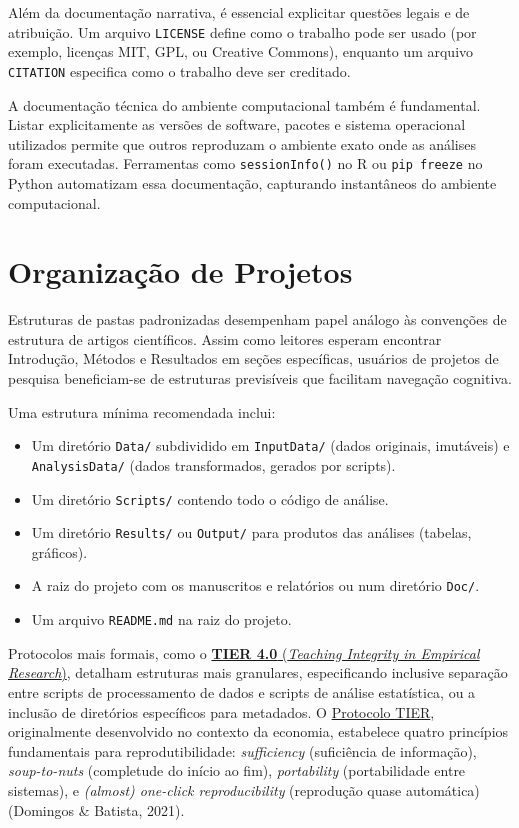 \documentclass[
  a4paper,
]{book}
\providecommand{\tightlist}{%
  \setlength{\itemsep}{0pt}\setlength{\parskip}{0pt}}\usepackage{longtable,booktabs,array}
\begin{document}
Além da documentação narrativa, é essencial explicitar questões legais e
de atribuição. Um arquivo \texttt{LICENSE} define como o trabalho pode
ser usado (por exemplo, licenças MIT, GPL, ou Creative Commons),
enquanto um arquivo \texttt{CITATION} especifica como o trabalho deve
ser creditado.

A documentação técnica do ambiente computacional também é fundamental.
Listar explicitamente as versões de software, pacotes e sistema
operacional utilizados permite que outros reproduzam o ambiente exato
onde as análises foram executadas. Ferramentas como
\texttt{sessionInfo()} no R ou \texttt{pip\ freeze} no Python
automatizam essa documentação, capturando instantâneos do ambiente
computacional.

\section{Organização de Projetos}\label{organizauxe7uxe3o-de-projetos}

Estruturas de pastas padronizadas desempenham papel análogo às
convenções de estrutura de artigos científicos. Assim como leitores
esperam encontrar Introdução, Métodos e Resultados em seções
específicas, usuários de projetos de pesquisa beneficiam-se de
estruturas previsíveis que facilitam navegação cognitiva.

Uma estrutura mínima recomendada inclui:

\begin{itemize}
\tightlist
\item
  Um diretório \texttt{Data/} subdividido em \texttt{InputData/} (dados
  originais, imutáveis) e \texttt{AnalysisData/} (dados transformados,
  gerados por scripts).
\item
  Um diretório \texttt{Scripts/} contendo todo o código de análise.
\item
  Um diretório \texttt{Results/} ou \texttt{Output/} para produtos das
  análises (tabelas, gráficos).
\item
  A raiz do projeto com os manuscritos e relatórios ou num diretório
  \texttt{Doc/}.
\item
  Um arquivo \texttt{README.md} na raiz do projeto.
\end{itemize}

Protocolos mais formais, como o
\href{https://www.projecttier.org/tier-protocol/protocol-4-0/}{\textbf{TIER
4.0} (\emph{Teaching Integrity in Empirical Research})}, detalham
estruturas mais granulares, especificando inclusive separação entre
scripts de processamento de dados e scripts de análise estatística, ou a
inclusão de diretórios específicos para metadados. O
\href{https://www.projecttier.org/tier-protocol/protocol-4-0/}{Protocolo
TIER}, originalmente desenvolvido no contexto da economia, estabelece
quatro princípios fundamentais para reprodutibilidade:
\emph{sufficiency} (suficiência de informação), \emph{soup-to-nuts}
(completude do início ao fim), \emph{portability} (portabilidade entre
sistemas), e \emph{(almost) one-click reproducibility} (reprodução quase
automática) (Domingos \& Batista, 2021).
\end{document}
